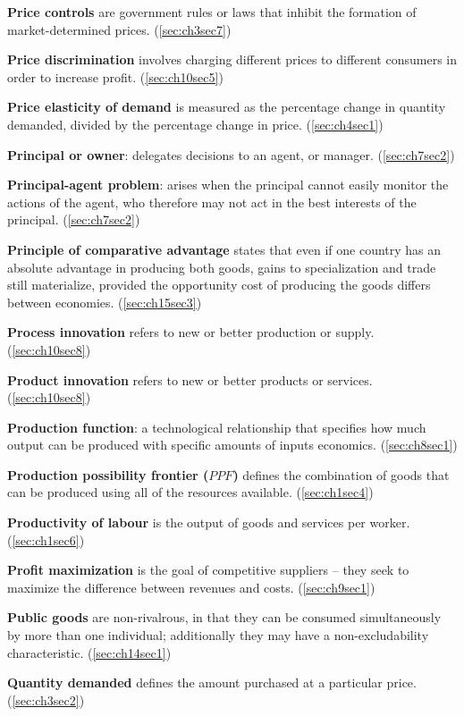 \textbf{Price controls} are government rules or laws that inhibit the formation of market-determined prices. (\ref{sec:ch3sec7})

\textbf{Price discrimination} involves charging different prices to different consumers in order to increase profit. (\ref{sec:ch10sec5})

\textbf{Price elasticity of demand} is measured as the percentage change in quantity demanded, divided by the percentage change in price. (\ref{sec:ch4sec1})

\textbf{Principal or owner}: delegates decisions to an agent, or manager. (\ref{sec:ch7sec2})

\textbf{Principal-agent problem}: arises when the principal cannot easily monitor the actions of the agent, who therefore may not act in the best interests of the principal. (\ref{sec:ch7sec2})

\textbf{Principle of comparative advantage} states that even if one country has an absolute advantage in producing both goods, gains to specialization and trade still materialize, provided the opportunity cost of producing the goods differs between economies. (\ref{sec:ch15sec3})

\textbf{Process innovation} refers to new or better production or supply. (\ref{sec:ch10sec8})

\textbf{Product innovation} refers to new or better products or services. (\ref{sec:ch10sec8})

\textbf{Production function}: a technological relationship that specifies how much output can be produced with specific amounts of inputs economics. (\ref{sec:ch8sec1})

\textbf{Production possibility frontier ($PPF$)} defines the combination of goods that can be produced using all of the resources available. (\ref{sec:ch1sec4})

\textbf{Productivity of labour} is the output of goods and services per worker. (\ref{sec:ch1sec6})

\textbf{Profit maximization} is the goal of competitive suppliers -- they seek to maximize the difference between revenues and costs. (\ref{sec:ch9sec1})

\textbf{Public goods} are non-rivalrous, in that they can be consumed simultaneously by more than one individual; additionally they may have a non-excludability characteristic. (\ref{sec:ch14sec1})

\textbf{Quantity demanded} defines the amount purchased at a particular price. (\ref{sec:ch3sec2})

